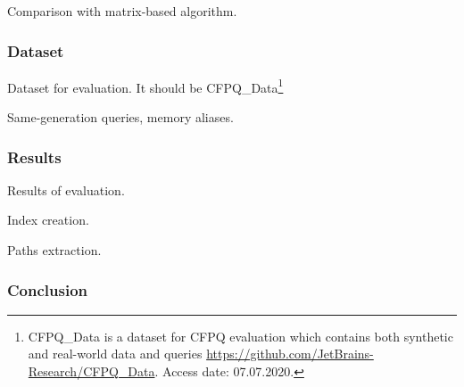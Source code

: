 Comparison with matrix-based algorithm.

\subsubsection{Dataset}

Dataset for evaluation. 
It should be CFPQ\_Data\footnote{CFPQ\_Data is a dataset for CFPQ evaluation which contains both synthetic and real-world data and queries \url{https://github.com/JetBrains-Research/CFPQ\_Data}. Access date: 07.07.2020.}

Same-generation queries, memory aliases.

\subsubsection{Results}

Results of evaluation.

Index creation.

Paths extraction.

\subsubsection{Conclusion}
